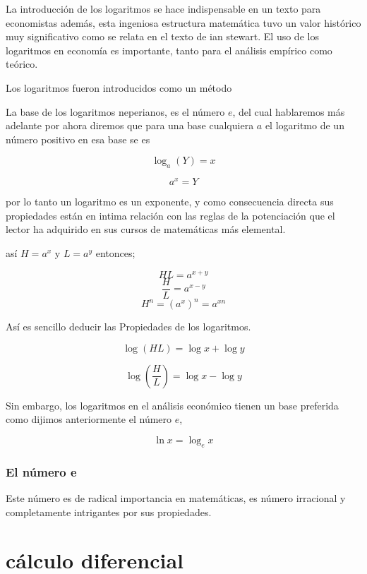 \documentclass[12pt]{article}
\begin{document}
{ 
 

La introducción de los logaritmos se hace indispensable en un texto para economistas además, esta ingeniosa estructura matemática tuvo un valor histórico muy significativo como se relata en el texto de ian stewart. El uso de los logaritmos en economía es importante, tanto para el análisis empírico como teórico.

Los logaritmos fueron introducidos como un método 




La base de los logaritmos neperianos, es el número $e$, del cual hablaremos más adelante por ahora diremos que para una base cualquiera $a$ el logaritmo  de un número positivo en esa base se es


$$\log_{a}(Y)=x$$

$$a^{x}=Y$$

por lo tanto un logaritmo es un exponente, y como consecuencia directa  sus propiedades están en intima relación con las reglas de la potenciación que el lector ha adquirido en sus cursos de matemáticas más elemental. 

así $H=a^{x}$ y $L=a^{y}$ entonces;

$$HL= a^{x+y}$$
$$\dfrac{H}{L}= a^{x-y}$$
$$ H^{n}= (a^{x})^{n}= a^{xn}$$





Así es sencillo deducir las Propiedades de los logaritmos.



$$\log(HL)= \log x + \log y$$ 




$$ \log(\dfrac{H}{L})= \log x - \log y$$

Sin embargo, los logaritmos en el análisis económico tienen un base preferida como dijimos anteriormente el número $e$, 

$$ \ln x = \log_{e}x$$

\subsubsection{El número e}

Este número es de radical importancia en matemáticas, es número irracional  y completamente intrigantes por sus propiedades.
 



\section{cálculo diferencial}

}
\end{document}
